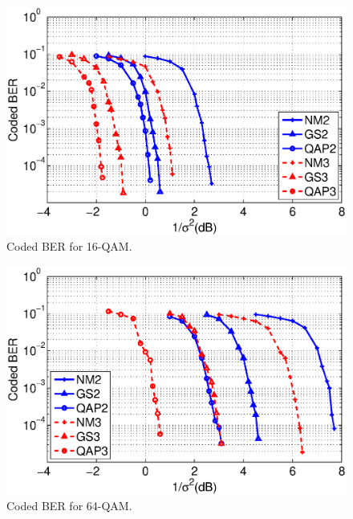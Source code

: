 \documentclass[journal]{IEEEtran}
\begin{document}
\begin{figure}[htb]
  \centering
  \includegraphics[width=\columnwidth]{./figs/waterfall_16QAM.eps}
  \caption{Coded BER for 16-QAM.}
  \label{fig:coded_16QAM}
\end{figure}

\begin{figure}[htb]
  \centering
  \includegraphics[width=\columnwidth]{./figs/waterfall_64QAM.eps}
  \caption{Coded BER for 64-QAM.}
  \label{fig:coded_64QAM}
\end{figure}
\end{document}
